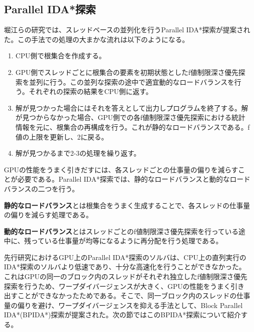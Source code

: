 \documentclass[a4paper,11pt,oneside,openany]{jsbook}
\begin{document}
\subsection{Parallel IDA*探索}
堀江らの研究\cite{HA17}では、スレッドベースの並列化を行うParallel IDA*探索が提案された。この手法での処理の大まかな流れは以下のようになる。
\begin{enumerate}
 \item CPU側で根集合を作成する。
 \item GPU側でスレッドごとに根集合の要素を初期状態としたf値制限深さ優先探索を並列に行う。この並列な探索の途中で適宜動的なロードバランスを行う。それぞれの探索の結果をCPU側に返す。
 \item 解が見つかった場合にはそれを答えとして出力しプログラムを終了する。解が見つからなかった場合、GPU側での各f値制限深さ優先探索における統計情報を元に、根集合の再構成を行う。これが静的なロードバランスである。f値の上限を更新し、2に戻る。
 \item 解が見つかるまで2-3の処理を繰り返す。
\end{enumerate}

GPUの性能をうまく引きだすには、各スレッドごとの仕事量の偏りを減らすことが必要である。Parallel IDA*探索では、静的なロードバランスと動的なロードバランスの二つを行う。

{\bf 静的なロードバランス}とは根集合をうまく生成することで、各スレッドの仕事量の偏りを減らす処理である。

{\bf 動的なロードバランス}とはスレッドごとのf値制限深さ優先探索を行っている途中に、残っている仕事量が均等になるように再分配を行う処理である。

先行研究\cite{HA17}におけるGPU上のParallel IDA*探索のソルバは、CPU上の直列実行のIDA*探索のソルバより低速であり、十分な高速化を行うことができなかった。これはGPUの同一のブロック内のスレッドがそれぞれ独立したf値制限深さ優先探索を行うため、ワープダイバージェンスが大きく、GPUの性能をうまく引き出すことができなかったためである。そこで、同一ブロック内のスレッドの仕事量の偏りを避け、ワープダイバージェンスを抑える手法として、Block Parallel IDA*(BPIDA*)探索\cite{HA17}が提案された。次の節ではこのBPIDA*探索について紹介する。
\end{document}
